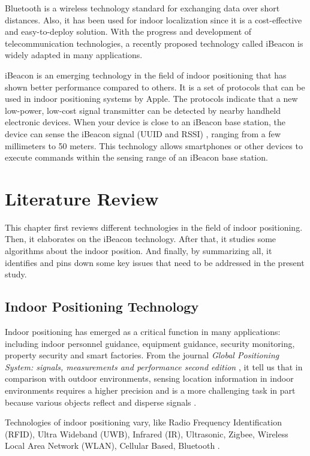 \documentclass{sigchi}
\begin{document}
Bluetooth is a wireless technology standard for exchanging data over short distances. Also, it has been used for indoor localization since it is a cost-effective and easy-to-deploy solution. With the progress and development of telecommunication technologies, a recently proposed technology called iBeacon is widely adapted in many applications.

iBeacon is an emerging technology in the field of indoor positioning that has shown better performance compared to others. It is a set of protocols that can be used in indoor positioning systems by Apple. The protocols indicate that a new low-power, low-cost signal transmitter can be detected by nearby handheld electronic devices. When your device is close to an iBeacon base station, the device can sense the iBeacon signal (UUID and RSSI) \cite{feldmann2003indoor}, ranging from a few millimeters to 50 meters. This technology allows smartphones or other devices to execute commands within the sensing range of an iBeacon base station.


\section{Literature Review}

This chapter first reviews different technologies in the field of indoor positioning. Then, it elaborates on the iBeacon technology. After that, it studies some algorithms about the indoor position. And finally, by summarizing all, it identifies and pins down some key issues that need to be addressed in the present study.

\subsection{Indoor Positioning Technology}

Indoor positioning has emerged as a critical function in many applications: including indoor personnel guidance, equipment guidance, security monitoring, property security and smart factories. From the journal \emph{Global Positioning System: signals, measurements and performance second edition} \cite{alarifi2016ultra}, it tell us that in comparison with outdoor environments, sensing location information in indoor environments requires a higher precision and is a more challenging task in part because various objects reflect and disperse signals . 

Technologies of indoor positioning vary, like Radio Frequency Identification (RFID), Ultra Wideband (UWB), Infrared (IR), Ultrasonic, Zigbee, Wireless Local Area Network (WLAN), Cellular Based, Bluetooth \cite{mautz2012indoor}. 
\end{document}

